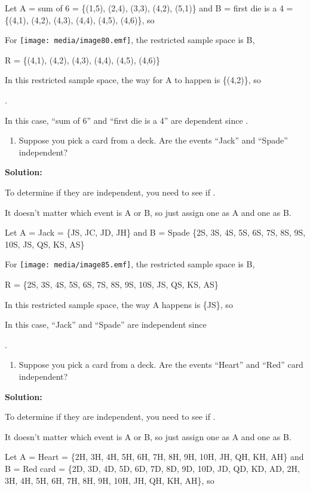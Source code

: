 \documentclass[]{book}
\providecommand{\tightlist}{%
  \setlength{\itemsep}{0pt}\setlength{\parskip}{0pt}}
\begin{document}
Let A = sum of 6 = \{(1,5), (2,4), (3,3), (4,2), (5,1)\} and B = first
die is a 4 = \{(4,1), (4,2), (4,3), (4,4), (4,5), (4,6)\}, so

For \texttt{[image: media/image80.emf]}, the restricted sample space is B,

R = \{(4,1), (4,2), (4,3), (4,4), (4,5), (4,6)\}

In this restricted sample space, the way for A to happen is \{(4,2)\},
so

.

In this case, ``sum of 6'' and ``first die is a 4'' are dependent since
.

\begin{enumerate}
\def\labelenumi{\alph{enumi}.}
\setcounter{enumi}{2}
\tightlist
\item
  Suppose you pick a card from a deck. Are the events ``Jack'' and
  ``Spade'' independent?
\end{enumerate}

\textbf{Solution:}

To determine if they are independent, you need to see if .

It doesn't matter which event is A or B, so just assign one as A and
one as B.

Let A = Jack = \{JS, JC, JD, JH\} and B = Spade \{2S, 3S, 4S, 5S, 6S,
7S, 8S, 9S, 10S, JS, QS, KS, AS\}

For \texttt{[image: media/image85.emf]}, the restricted sample space is B,

R = \{2S, 3S, 4S, 5S, 6S, 7S, 8S, 9S, 10S, JS, QS, KS, AS\}

In this restricted sample space, the way A happens is \{JS\}, so

In this case, ``Jack'' and ``Spade'' are independent since

.

\begin{enumerate}
\def\labelenumi{\alph{enumi}.}
\setcounter{enumi}{3}
\tightlist
\item
  Suppose you pick a card from a deck. Are the events ``Heart'' and
  ``Red'' card independent?
\end{enumerate}

\textbf{Solution:}

To determine if they are independent, you need to see if .

It doesn't matter which event is A or B, so just assign one as A and
one as B.

Let A = Heart = \{2H, 3H, 4H, 5H, 6H, 7H, 8H, 9H, 10H, JH, QH, KH,
AH\} and B = Red card = \{2D, 3D, 4D, 5D, 6D, 7D, 8D, 9D, 10D, JD, QD,
KD, AD, 2H, 3H, 4H, 5H, 6H, 7H, 8H, 9H, 10H, JH, QH, KH, AH\}, so
\end{document}
